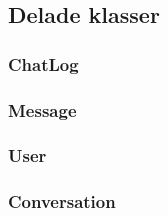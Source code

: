 \documentclass[a4paper,11pt]{article}
\begin{document}
	\subsection{Delade klasser}
		\subsubsection{ChatLog}
			
			\subsubsection{Message}
			
			\subsubsection{User}
			
			\subsubsection{Conversation}
			








	
\end{document}
